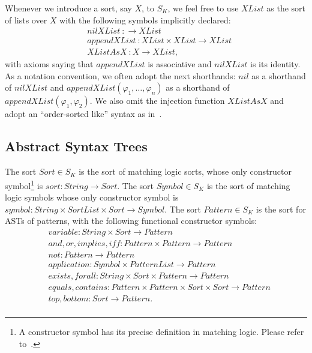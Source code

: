 \documentclass[UTF8]{article}
\theoremstyle{plain}
\theoremstyle{definition}
\theoremstyle{remark}
\begin{document}
Whenever we introduce a sort, say $\mathit{X}$, to $S_K$, we feel free to 
use $\mathit{XList}$ as the sort of lists over $\mathit{X}$ 
with the following symbols implicitly declared:
\begin{align*}
&\mathit{nilXList} \ \colon \to \mathit{XList} \\
&\mathit{appendXList} \ \colon \mathit{XList} \times \mathit{XList} \to 
  \mathit{XList}\\
&\mathit{XListAsX} \ \colon \mathit{X} \to \mathit{XList},
\end{align*}
with axioms saying that $\mathit{appendXList}$ is associative and $\mathit{nilXList}$ is its identity.
As a notation convention, we often adopt the next shorthands:
 $\mathit{nil}$ as a shorthand
 of $\mathit{nilXList}$
and 
$\mathit{appendXList}(\varphi_1,\dots,\varphi_n)$ as a shorthand of $\mathit{appendXList(\varphi_1, 
\varphi_2)}$.
We also omit the injection function $\mathit{XListAsX}$ and adopt an 
``order-sorted like'' syntax as in~\cite{?}.


\subsection{Abstract Syntax Trees}
The sort $\mathit{Sort} \in S_K$ is the sort of matching logic sorts, whose only constructor symbol\footnote{A constructor symbol has its precise definition in matching logic. Please refer to~\cite{?}.} is $\mathit{sort} \colon \mathit{String} \to \mathit{Sort}$.
The sort $\mathit{Symbol} \in S_K$ is the sort of matching logic symbols whose
only constructor symbol is $\mathit{symbol} \colon \mathit{String} \times \mathit{SortList} \times \mathit{Sort} \to \mathit{Symbol}$. 
The sort $\mathit{Pattern} \in S_K$ is the sort for ASTs of patterns, with the 
following functional constructor symbols:
\begin{align*}
&\mathit{variable} \colon \mathit{String} \times \mathit{Sort} \to 
\mathit{Pattern} \\
&\mathit{and}, \mathit{or}, \mathit{implies}, \mathit{iff} \colon \mathit{Pattern} \times \mathit{Pattern} \to \mathit{Pattern} \\
&\mathit{not} \colon \mathit{Pattern} \to \mathit{Pattern} \\
&\mathit{application} \colon \mathit{Symbol} \times \mathit{PatternList} \to 
\mathit{Pattern} \\
&\mathit{exists}, \mathit{forall} \colon \mathit{String} \times 
\mathit{Sort} \times \mathit{Pattern} \to \mathit{Pattern} \\
&\mathit{equals}, \mathit{contains} \colon \mathit{Pattern} \times 
\mathit{Pattern} \times \mathit{Sort} \times \mathit{Sort} \to \mathit{Pattern} \\
&\mathit{top}, \mathit{bottom} \colon \mathit{Sort} \to \mathit{Pattern}. \\
\end{align*}
\end{document}
